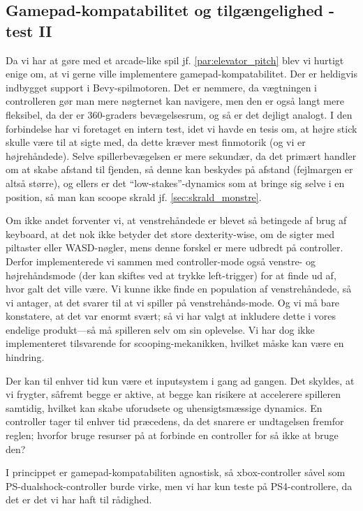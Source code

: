 \subsection{Gamepad-kompatabilitet og tilgængelighed - test II}
Da vi har at gøre med et arcade-like spil jf. \autoref{par:elevator_pitch} blev vi hurtigt enige om, at vi gerne ville implementere gamepad-kompatabilitet. Der er heldigvis indbygget support i Bevy-spilmotoren. Det er nemmere, da vægtningen i controlleren gør man mere nøgternet kan navigere, men den er også langt mere fleksibel, da der er 360-graders bevægelsesrum, og så er det dejligt analogt. I den forbindelse har vi foretaget en intern test, idet vi havde en tesis om, at højre stick skulle være til at sigte med, da dette kræver mest finmotorik (og vi er højrehåndede). Selve spillerbevægelsen er mere sekundær, da det primært handler om at skabe afstand til fjenden, så denne kan beskydes på afstand (fejlmargen er altså større), og ellers er det ``low-stakes''-dynamics som at bringe sig selve i en position, så man kan scoope skrald jf. \autoref{sec:skrald_monstre}.

Om ikke andet forventer vi, at venstrehåndede er blevet så betingede af brug af keyboard, at det nok ikke betyder det store dexterity-wise, om de sigter med piltaster eller WASD-nøgler, mens denne forskel er mere udbredt på controller. Derfor implementerede vi sammen med controller-mode også venstre- og højrehåndsmode (der kan skiftes ved at trykke left-trigger) for at finde ud af, hvor galt det ville være. Vi kunne ikke finde en population af venstrehåndede, så vi antager, at det svarer til at vi spiller på venstrehånds-mode. Og vi må bare konstatere, at det var enormt svært; så vi har valgt at inkludere dette i vores endelige produkt---så må spilleren selv om sin oplevelse. Vi har dog ikke implementeret tilsvarende for scooping-mekanikken, hvilket måske kan være en hindring.

Der kan til enhver tid kun være et inputsystem i gang ad gangen. Det skyldes, at vi frygter, såfremt begge er aktive, at begge kan risikere at accelerere spilleren samtidig, hvilket kan skabe uforudsete og uhensigtsmæssige dynamics. En controller tager til enhver tid præcedens, da det snarere er undtagelsen fremfor reglen; hvorfor bruge resurser på at forbinde en controller for så ikke at bruge den?

I princippet er gamepad-kompatabiliten agnostisk, så xbox-controller såvel som PS-dualshock-controller burde virke, men vi har kun teste på PS4-controllere, da det er det vi har haft til rådighed.

